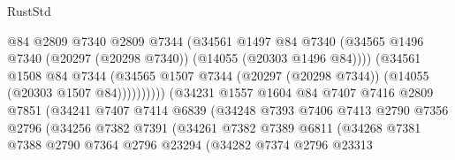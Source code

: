 \begin{lexlean}{RustStd}
\begin{coremodule}
                                      @84
                                      @2809
                                      @7340
                                      @2809
                                      @7344
                                      (@34561
                                        @1497
                                        @84
                                        @7340
                                        (@34565
                                          @1496
                                          @7340
                                          (@20297 (@20298 @7340))
                                          (@14055 (@20303 @1496 @84))))
                                      (@34561
                                        @1508
                                        @84
                                        @7344
                                        (@34565
                                          @1507
                                          @7344
                                          (@20297 (@20298 @7344))
                                          (@14055 (@20303 @1507 @84))))))))))
                          (@34231
                            @1557
                            @1604
                            @84
                            @7407
                            @7416
                            @2809
                            @7851
                            (@34241
                              @7407
                              @7414
                              @6839
                              (@34248
                                @7393
                                @7406
                                @7413
                                @2790
                                @7356
                                @2796
                                (@34256
                                  @7382
                                  @7391
                                  (@34261
                                    @7382
                                    @7389
                                    @6811
                                    (@34268
                                      @7381
                                      @7388
                                      @2790
                                      @7364
                                      @2796
                                      @23294
                                      (@34282
                                        @7374
                                        @2796
                                        @23313

\end{coremodule}
\end{lexlean}
